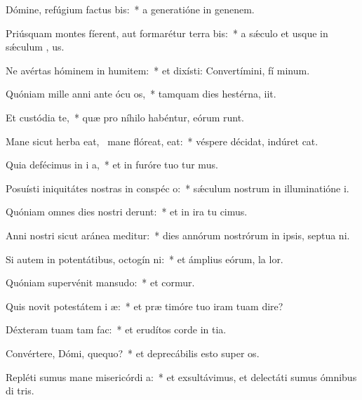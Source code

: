 \item Dómine, refúgium factus  bis:~* a generatióne in genenem.
\item Priúsquam montes fíerent, aut formarétur terra  bis:~* a sǽculo et usque in sǽculum  , us.
\item Ne avértas hóminem in humitem:~* et dixísti: Convertímini, fí minum.
\item Quóniam mille anni ante ócu os,~* tamquam dies hestérna,  iit.
\item Et custódia  te,~* quæ pro níhilo habéntur, eórum  runt.
\item Mane sicut herba eat,~\pscross{} mane flóreat,  eat:~* véspere décidat, indúret  cat.
\item Quia defécimus in i a,~* et in furóre tuo tur mus.
\item Posuísti iniquitátes nostras in conspéc o:~* sǽculum nostrum in illuminatióne  i.
\item Quóniam omnes dies nostri derunt:~* et in ira tu cimus.
\item Anni nostri sicut aránea meditur:~* dies annórum nostrórum in ipsis, septua ni.
\item Si autem in potentátibus, octogín ni:~* et ámplius eórum, la  lor.
\item Quóniam supervénit mansudo:~* et cormur.
\item Quis novit potestátem i æ:~* et præ timóre tuo iram tuam dire?
\item Déxteram tuam  tam fac:~* et erudítos corde in tia.
\item Convértere, Dómi, quequo?~* et deprecábilis esto super  os.
\item Repléti sumus mane misericórdi a:~* et exsultávimus, et delectáti sumus ómnibus di tris.
